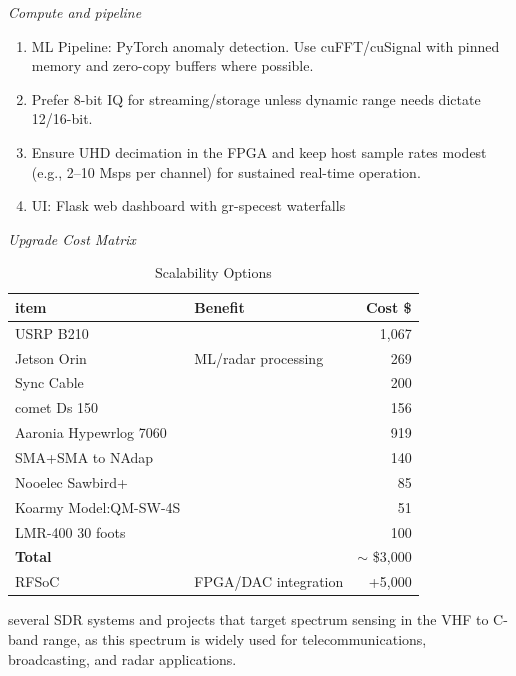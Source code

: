 \documentclass[11pt]{report}
\newcommand{\gc}[1]{\textcolor[rgb]{1.00,0.00,0.00}{#1}}
\newcommand{\blue}[1]{\textcolor[rgb]{0.00,0.00,1.00}{#1}}
\begin{document}
\begin{description}
\emph{Compute and pipeline}

\begin{enumerate}[leftmargin=*,label={\arabic*.}]
	\item \gc{ML Pipeline}: PyTorch anomaly detection. Use cuFFT/cuSignal with pinned memory and zero-copy buffers where possible.
	\item Prefer 8-bit IQ for streaming/storage unless dynamic range needs dictate 12/16-bit.
		\item Ensure UHD decimation in the FPGA and keep host sample rates modest (e.g., 2–10 Msps per channel) for sustained real-time operation.
	\item \gc{UI}: Flask web dashboard with gr-specest waterfalls
\end{enumerate}

\emph{Upgrade Cost Matrix}
\begin{table}[h]
	\centering
	\begin{tabular}{@{}l p{6cm} r@{}}
		\toprule
		\textbf{item} & \textbf{Benefit} & \textbf{Cost \$} \\
		\midrule
		USRP B210 & & 1,067 \\
		Jetson Orin & ML/radar processing & 269 \\
		Sync Cable& & 200\\
		comet Ds 150& & 156\\
		Aaronia Hypewrlog 7060&&919\\
		SMA+SMA to NAdap&& 140 \\
		Nooelec Sawbird+&& 85\\
		Koarmy Model:QM-SW-4S && 51\\
		LMR-400 30 foots&& 100\\
		\textbf{Total}&& $\sim$ \blue{\$3,000}\\
		\bottomrule
				RFSoC & FPGA/DAC integration & \gc{+5,000} \\
				\bottomrule
	\end{tabular}
	\caption{Scalability Options}
\end{table}

\item[Similar projects:] several SDR systems and projects that target spectrum sensing in the VHF to C-band range, as this spectrum is widely used for telecommunications, broadcasting, and radar applications.


\end{description}
\end{document}
